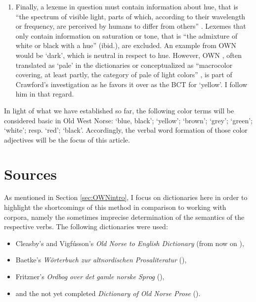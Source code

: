 \documentclass[output=paper,colorlinks,citecolor=brown]{langscibook}
\begin{document}
\begin{enumerate}
    \item[e)] Finally, a lexeme in question must contain information about hue, that is “the spectrum of visible light, parts of which, according to their wavelength or frequency, are perceived by humans to differ from others” \citep[3]{Biggam2012}. Lexemes that only contain information on saturation or tone, that is “the admixture of white or black with a hue” (ibid.), are excluded. An example from OWN would be  ‘dark’, which is neutral in respect to hue. However, OWN , often translated as ‘pale’ in the dictionaries or conceptualized as “macrocolor covering, at least partly, the category of pale of light colors” \citep[143]{Wolf2013}, is part of Crawford’s investigation as he favors it over  as the BCT  for ‘yellow’. I follow him in that regard.

\end{enumerate}

In light of what we have established so far, the following color terms will be considered basic in Old West Norse:  ‘blue, black’;  ‘yellow’;  ‘brown’;  ‘grey’;  ‘green’;  ‘white’;  resp.  ‘red’;  ‘black’. Accordingly, the verbal word formation of those color adjectives will be the focus of this article.

\section{Sources}
\label{sec:OWNSources}

As mentioned in Section \ref{sec:OWNintro}, I focus on dictionaries here in order to highlight the shortcomings of this method in comparison to working with corpora, namely the sometimes imprecise determination of the semantics of the respective verbs. The following dictionaries were used:

\begin{itemize}
\item Cleasby’s and Vigfússon’s \textit{Old Norse to English Dictionary} (from now on ),
\item Baetke’s \textit{Wörterbuch zur altnordischen Prosaliteratur} (), 
\item Fritzner’s \textit{Ordbog over det gamle norske Sprog} (), 
\item and the not yet completed \textit{Dictionary of Old Norse Prose} (). 
\end{itemize}
\end{document}
